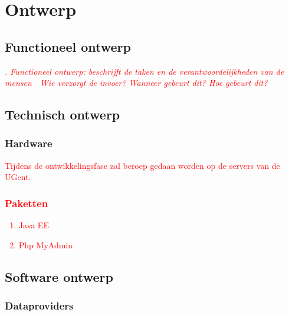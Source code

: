 \documentclass[ps,a4paper,oneside]{report}
\begin{document}
\chapter{Ontwerp}
\section{Functioneel ontwerp}
\textcolor{red}{\textit{. Functioneel ontwerp: beschrijft de taken en de
verantwoordelijkheden van de mensen
 Wie verzorgt de invoer? Wanneer gebeurt dit?
Hoe gebeurt dit? }}
\section{Technisch ontwerp}
\subsection{Hardware}
\textcolor{red}{Tijdens de ontwikkelingsfase zal beroep gedaan worden op de servers van de UGent.
\subsection{Paketten}
\begin{enumerate}
	\item Java EE
	\item Php MyAdmin
\end{enumerate}
}
\section{Software ontwerp}
\subsection{Dataproviders}
\end{document}
